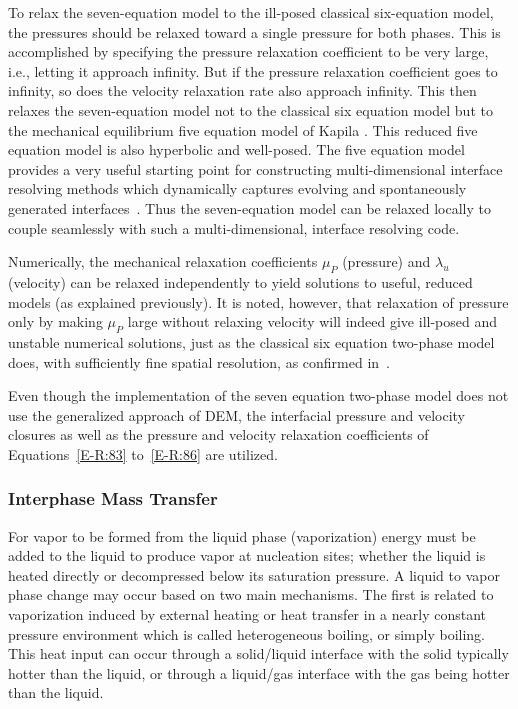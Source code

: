 To relax the seven-equation model to
the ill-posed classical six-equation model, the pressures should be
relaxed toward a single pressure for both phases.  This is
accomplished by specifying the pressure relaxation coefficient to be
very large, i.e., letting it approach infinity.  But if the pressure
relaxation coefficient goes to infinity, so does the velocity
relaxation rate also approach infinity.  This then relaxes the
seven-equation model not to the classical six equation model but to the
mechanical equilibrium five equation model of Kapila \cite{Kapila_2001}.  This reduced
five equation model is also hyperbolic and well-posed. The five equation
model provides a very useful starting point for constructing
multi-dimensional interface resolving methods which dynamically
captures evolving and spontaneously generated
interfaces~\cite{Saurel_2009}. Thus the seven-equation model
can be relaxed locally to couple seamlessly with such a
multi-dimensional, interface resolving code.

Numerically, the mechanical relaxation coefficients $\mu_P$
(pressure) and $\lambda_u$ (velocity) can be relaxed independently to
yield solutions to useful, reduced models (as explained previously).  It
is noted, however, that relaxation of pressure only by making $\mu_P$
large without relaxing velocity will indeed give ill-posed and
unstable numerical solutions, just as the classical six equation
two-phase model does, with sufficiently fine spatial resolution, as
confirmed in~\cite{SEM,Herrard_2005}.

Even though the implementation of the seven equation two-phase
model does not use
the generalized approach of DEM, the interfacial pressure and velocity
closures as well as the pressure and velocity relaxation coefficients
of Equations~\eqref{E-R:83} to~\eqref{E-R:86} are utilized.
\subsubsection{Interphase Mass Transfer}
For vapor to be formed from the liquid phase (vaporization) energy
must be added to the liquid to produce vapor at nucleation sites;
whether the liquid is heated directly or decompressed below its
saturation pressure.  A liquid to vapor phase change may occur based
on two main mechanisms.  The first is related to vaporization induced
by external heating or heat transfer in a nearly constant pressure
environment which is called heterogeneous boiling, or simply
boiling.  This heat input can occur through a solid/liquid
interface with the solid typically hotter than the liquid, or through
a liquid/gas interface with the gas being hotter than the liquid.

